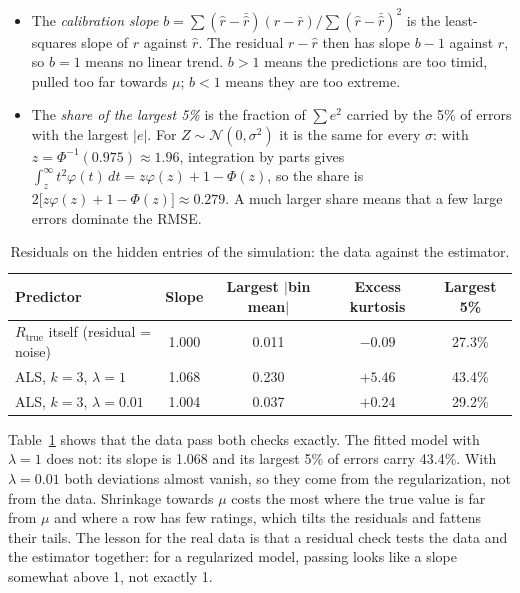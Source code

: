 \documentclass[11pt]{article}
\theoremstyle{definition}
\begin{document}
\begin{itemize}[leftmargin=*]
  \item The \emph{calibration slope} $b = \sum(\hat r - \bar{\hat r})(r - \bar r) \big/
        \sum (\hat r - \bar{\hat r})^2$ is the least-squares slope of $r$ against $\hat r$.
        The residual $r - \hat r$ then has slope $b - 1$ against $\hat r$, so $b = 1$ means no
        linear trend. $b > 1$ means the predictions are too timid, pulled too far towards $\mu$;
        $b < 1$ means they are too extreme.
  \item The \emph{share of the largest 5\%} is the fraction of $\sum e^2$ carried by the 5\% of
        errors with the largest $|e|$. For $Z \sim \mathcal N(0, \sigma^2)$ it is the same for
        every $\sigma$: with $z = \Phi^{-1}(0.975) \approx 1.96$, integration by parts gives
        $\int_z^\infty t^2 \varphi(t)\,dt = z\varphi(z) + 1 - \Phi(z)$, so the share is
        $2\bigl[z\varphi(z) + 1 - \Phi(z)\bigr] \approx 0.279$. A much larger share means that a
        few large errors dominate the RMSE.
\end{itemize}

\begin{table}[htbp]
\centering
\begin{tabular}{@{}lcccc@{}}
\toprule
Predictor & Slope & Largest $|$bin mean$|$ & Excess kurtosis & Largest 5\% \\
\midrule
$R_{\mathrm{true}}$ itself (residual = noise) & 1.000 & 0.011 & $-0.09$ & 27.3\% \\
ALS, $k = 3$, $\lambda = 1$ & 1.068 & 0.230 & $+5.46$ & 43.4\% \\
ALS, $k = 3$, $\lambda = 0.01$ & 1.004 & 0.037 & $+0.24$ & 29.2\% \\
\bottomrule
\end{tabular}
\caption{Residuals on the hidden entries of the simulation: the data against the estimator.}
\label{tab:passing}
\end{table}

Table~\ref{tab:passing} shows that the data pass both checks exactly. The fitted model with
$\lambda = 1$ does not: its slope is 1.068 and its largest 5\% of errors carry 43.4\%. With
$\lambda = 0.01$ both deviations almost vanish, so they come from the regularization, not from the
data. Shrinkage towards $\mu$ costs the most where the true value is far from $\mu$ and where a
row has few ratings, which tilts the residuals and fattens their tails. The lesson for the real data
is that a residual check tests the data and the estimator together: for a regularized model,
passing looks like a slope somewhat above 1, not exactly 1.
\end{document}
